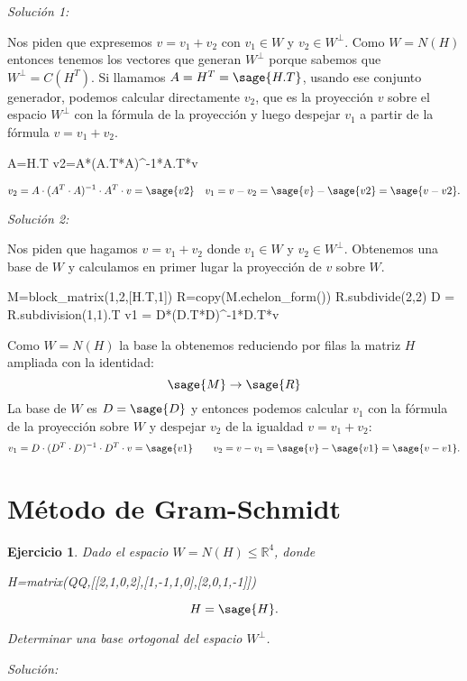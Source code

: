 \documentclass{amsart}
\newtheorem{ejer}{Ejercicio}
\def\r{\mathbb{R}}
\begin{document}
{\it Solución 1:}

Nos piden que expresemos $v = v_1 + v_2$ con $v_1\in W$ y $v_2\in W^\perp $.
Como $W = N(H)$ entonces tenemos los vectores que generan $W^\perp$ porque 
sabemos que $W^{\perp} = C(H^T)$. Si llamamos $A = H^T = \sage{H.T}$,   
usando ese conjunto generador, podemos calcular directamente $v_2$, que es la 
proyección $v$ sobre el espacio $W^{\perp}$ con la fórmula de la proyección y 
luego despejar $v_1$ a partir de la fórmula $v = v_1+v_2$.

\begin{sageblock}
A=H.T
v2=A*(A.T*A)^-1*A.T*v
\end{sageblock}

$$
v_2 = A\cdot(A^T\cdot A)^{-1}\cdot A^T\cdot v = \sage{v2} \quad 
v_1 = v-v_2 = \sage{v}-\sage{v2} = \sage{v-v2}.
$$

{\it Solución 2:}

Nos piden que hagamos $v = v_1 + v_2$ donde $v_1\in W$ y $v_2\in W^{\perp}$. 
Obtenemos una base de $W$ y 
calculamos en primer lugar la proyección de $v$ sobre $W$. 

\begin{sageblock}
M=block_matrix(1,2,[H.T,1])
R=copy(M.echelon_form())
R.subdivide(2,2)
D = R.subdivision(1,1).T
v1 = D*(D.T*D)^-1*D.T*v 
\end{sageblock}

Como $W = N(H)$ la base la obtenemos reduciendo por filas la matriz $H$ ampliada con la identidad:
$$ \sage{M} \to \sage{R} $$
La base de $W$ es $D= \sage{D}$ y entonces podemos calcular $v_1$ con la 
fórmula de la proyección sobre $W$ y despejar $v_2$ de la igualdad $v = v_1+v_2$: 
$$
v_1 = D\cdot (D^T\cdot D)^{-1}\cdot D^T\cdot v = \sage{v1} \qquad 
v_2 = v-v_1 = \sage{v}-\sage{v1} = \sage{v-v1}.
$$


\section{Método de Gram-Schmidt}

\begin{ejer}
Dado el espacio $W = N(H) \leq \r^4$, donde

\begin{sageblock}
H=matrix(QQ,[[2,1,0,2],[1,-1,1,0],[2,0,1,-1]])
\end{sageblock}

\[ H = \sage{H}.\] 

Determinar una base ortogonal del espacio $W^\perp$.
\end{ejer}
{\it Solución:}
\end{document}

